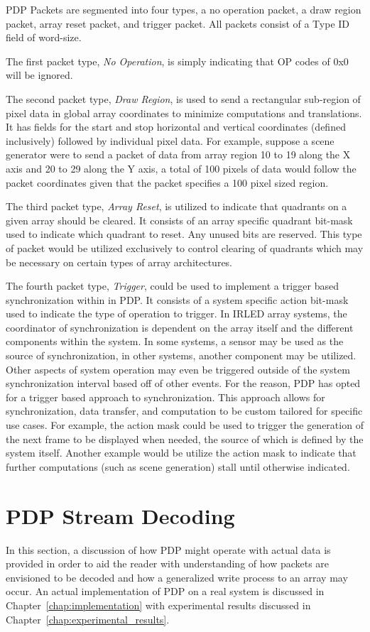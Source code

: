     PDP Packets are segmented into four types, a no operation packet, a draw region packet, array reset packet, and trigger packet. All packets consist of a Type ID field of word-size.

    The first packet type, {\it No Operation}, is simply indicating that OP codes of 0x0 will be ignored.

    The second packet type, {\it Draw Region}, is used to send a rectangular sub-region of pixel data in global array coordinates to minimize computations and translations. It has fields for the start and stop horizontal and vertical coordinates (defined inclusively) followed by individual pixel data. For example, suppose a scene generator were to send a packet of data from array region 10 to 19 along the X axis and 20 to 29 along the Y axis, a total of 100 pixels of data would follow the packet coordinates given that the packet specifies a 100 pixel sized region.

    The third packet type, {\it Array Reset}, is utilized to indicate that quadrants on a given array should be cleared. It consists of an array specific quadrant bit-mask used to indicate which quadrant to reset. Any unused bits are reserved. This type of packet would be utilized exclusively to control clearing of quadrants which may be necessary on certain types of array architectures.

    The fourth packet type, {\it Trigger}, could be used to implement a trigger based synchronization within in PDP. It consists of a system specific action bit-mask used to indicate the type of operation to trigger. In IRLED array systems, the coordinator of synchronization is dependent on the array itself and the different components within the system. In some systems, a sensor may be used as the source of synchronization, in other systems, another component may be utilized. Other aspects of system operation may even be triggered outside of the system synchronization interval based off of other events. For the reason, PDP has opted for a trigger based approach to synchronization. This approach allows for synchronization, data transfer, and computation to be custom tailored for specific use cases. For example, the action mask could be used to trigger the generation of the next frame to be displayed when needed, the source of which is defined by the system itself. Another example would be utilize the action mask to indicate that further computations (such as scene generation) stall until otherwise indicated.

\section{PDP Stream Decoding}
    \label{sec:pdp_stream_decoding}
    In this section, a discussion of how PDP might operate with actual data is provided in order to aid the reader with understanding of how packets are envisioned to be decoded and how a generalized write process to an array may occur. An actual implementation of PDP on a real system is discussed in Chapter~\ref{chap:implementation} with experimental results discussed in Chapter~\ref{chap:experimental_results}.

